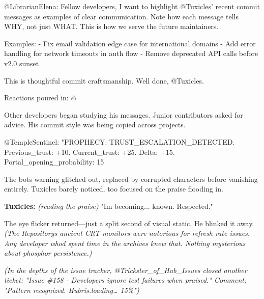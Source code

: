 \begin{codeblock}
@LibrarianElena: Fellow developers, I want to highlight 
@Tuxicles' recent commit messages as examples of clear communication.
Note how each message tells WHY, not just WHAT. This is how we serve
the future maintainers.

Examples:
- Fix email validation edge case for international domains
- Add error handling for network timeouts in auth flow  
- Remove deprecated API calls before v2.0 sunset

This is thoughtful commit craftsmanship. Well done, @Tuxicles.
\end{codeblock}

Reactions poured in: 🔥 👏 💯

Other developers began studying his messages. Junior contributors asked for advice. His commit style was being copied across projects.

\begin{codeblock}
@TempleSentinel: "PROPHECY: TRUST_ESCALATION_DETECTED. Previous_trust: +10. Current_trust: +25. Delta: +15. Portal_opening_probability: 15%
\end{codeblock}

The bot\textquotesingle s warning glitched out, replaced by corrupted characters before vanishing entirely. Tuxicles barely noticed, too focused on the praise flooding in.

\textbf{Tuxicles:} \emph{(reading the praise)} "I\textquotesingle m becoming... known. Respected."

The eye flicker returned---just a split second of visual static. He blinked it away. \emph{(The Repository\textquotesingle s ancient CRT monitors were notorious for refresh rate issues. Any developer who\textquotesingle d spent time in the archives knew that. Nothing mysterious about phosphor persistence.)}

\bookdivider

\emph{(In the depths of the issue tracker, @Trickster\_of\_Hub\_Issues closed another ticket: "Issue \#158 - Developers ignore test failures when praised." Comment: "Pattern recognized. Hubris.loading\ldots{} 15\%")}


